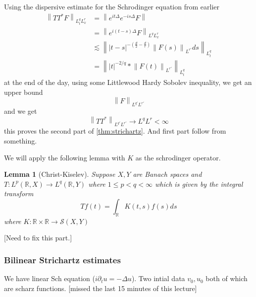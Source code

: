 \documentclass{article}
\def\purple{\color{Purple}}
\newcommand{\pnote}[1]{{\purple [#1]}} %
\newtheorem{lemma}{Lemma}
\def\R{\mathbb{R}} %
\newcommand\norm[1]{\left\lVert#1\right\rVert}
\begin{document}
Using the dispersive estimate for the Schrodinger equation from earlier
\begin{align*}
  \norm{TT^{*}F}_{L^{q}_{t}L_{x}^{r}} 
  &= \norm{ e^{it \Delta}e^{-is \Delta}F} \\
  &= \norm{e^{i(t-s)\Delta}F}_{L^{q}L^{r}_{x}} \\
  &\lesssim \norm{\left| t-s \right|^{-\left( \frac{d}{2}-\frac{d}{r} \right) }\norm{F(s)}_{L^{r'}}ds}_{L^{q}_{t}} \\
  &= \norm{ \left| t \right|^{-2/q}* \norm{F(t)}_{L^{r'}}}_{L^{q}_{t}}
\end{align*}
at the end of the day, using some Littlewood Hardy Sobolev inequality, we get an
upper bound
\begin{equation*}
  \norm{F}_{L^{q'}L^{r'}}
\end{equation*}
and we get
\begin{equation*}
  \norm{TT^{*}}_{L^{q'}L^{r'}}\to L^{q}L^{r}<\infty
\end{equation*}
this proves the second part of \cref{thm:strichartz}. And first part follow from
something.

We will apply the following lemma with $K$ as the schrodinger operator.

\begin{lemma}[Christ-Kiselev]
  \label{lem:christ-kiselev}
  Suppose $X,Y$ are Banach spaces and $T:L^{p}(\R,X)\to L^{q}(\R,Y)$
  where $1 \leq p < q <\infty$ which is given by the integral transform
  \begin{equation*}
    Tf(t) = \int_{\R}K(t,s)f(s)ds 
  \end{equation*}
  where $K:\R\times\R \to \mathcal{S}(X,Y)$ 
\end{lemma}
\pnote{Need to fix this part.}

\subsubsection{Bilinear Strichartz estimates}
We have linear Sch equation  ($i \partial_{t}u = - \Delta u $). Two intial data
$v_{0},u_{0}$ both of which are scharz functions. \pnote{missed the last 15
  minutes of this lecture}
\end{document}
